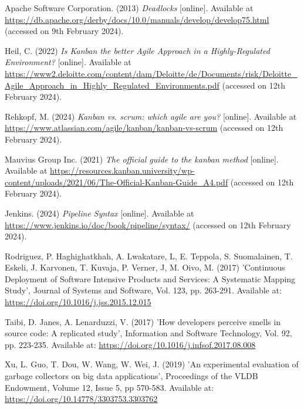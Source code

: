 \noindent Apache Software Corporation. (2013) \textit{Deadlocks} [online]. Available at \url{https://db.apache.org/derby/docs/10.0/manuals/develop/develop75.html} (accessed on 9th February 2024).
\vspace{0.2cm}

\noindent Heil, C. (2022) \textit{Is Kanban the better Agile Approach in a Highly-Regulated Environment?} [online]. Available at \url{https://www2.deloitte.com/content/dam/Deloitte/de/Documents/risk/Deloitte_Agile_Approach_in_Highly_Regulated_Environments.pdf} (accessed on 12th February 2024).
\vspace{0.2cm}

\noindent Rehkopf, M. (2024) \textit{Kanban vs. scrum: which agile are you?} [online]. Available at \url{https://www.atlassian.com/agile/kanban/kanban-vs-scrum} (accessed on 12th February 2024).
\vspace{0.2cm}

\noindent Mauvius Group Inc. (2021) \textit{The official guide to the kanban method} [online]. Available at \url{https://resources.kanban.university/wp-content/uploads/2021/06/The-Official-Kanban-Guide_A4.pdf} (accessed on 12th February 2024).
\vspace{0.2cm}

\noindent Jenkins. (2024) \textit{Pipeline Syntax} [online]. Available at \url{https://www.jenkins.io/doc/book/pipeline/syntax/} (accessed on 12th February 2024).
\vspace{0.2cm}

\noindent Rodriguez, P. Haghighatkhah, A. Lwakatare, L, E. Teppola, S. Suomalainen, T. Eskeli, J. Karvonen, T. Kuvaja, P. Verner, J, M. Oivo, M. (2017) 'Continuous Deployment of Software Intensive Products and Services: A Systematic Mapping Study', Journal of Systems and Software, Vol. 123, pp. 263-291. Available at: \url{https://doi.org/10.1016/j.jss.2015.12.015}
\vspace{0.2cm}

\noindent Taibi, D. Janes, A. Lenarduzzi, V. (2017) 'How developers perceive smells in source code: A replicated study', Information and Software Technology, Vol. 92, pp. 223-235. Available at: \url{https://doi.org/10.1016/j.infsof.2017.08.008}
\vspace{0.2cm}

\noindent Xu, L. Guo, T. Dou, W. Wang, W. Wei, J. (2019) 'An experimental evaluation of garbage collectors on big data applications', Proceedings of the VLDB Endowment, Volume 12, Issue 5, pp 570-583. Available at: \url{https://doi.org/10.14778/3303753.3303762}
\vspace{0.2cm}

